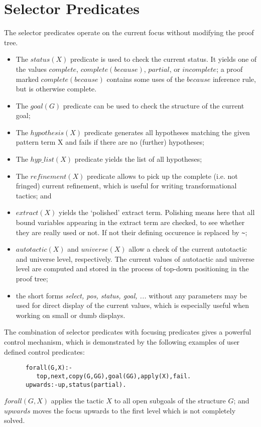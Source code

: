 \documentclass[11pt]{report}
\begin{document}
 \section{Selector Predicates}
 The selector predicates operate on the current focus without
 modifying the proof tree.
 \begin{itemize}
 \item
 The $status(X)$ predicate is used to check the current status.
 It yields one of the values $complete$, $complete(because)$, $partial$, or
 $incomplete$; a proof marked $complete(because)$ contains some uses
 of the $because$ inference rule, but is otherwise complete.
 \item
 The $goal(G)$ predicate can be used to check the structure
 of the current goal; 
 \item
 The $hypothesis(X)$ predicate generates all hypotheses matching the
 given pattern term X and fails if there are no (further) hypotheses;
 \item
 The $hyp\_list(X)$ predicate yields the list of all hypotheses;
 \item
 The $refinement(X)$ predicate allows to pick up the complete 
 (i.e. not fringed) current refinement,
 which is useful for writing transformational tactics; and
 \item
 $extract(X)$ yields the `polished' extract term. Polishing means
 here that all bound variables appearing in the extract term
 are checked, to see whether they are really used or not. If not their
 defining occurence is replaced by \verb'~';
 \item
 $autotactic(X)$ and $universe(X)$ allow a check of the
 current autotactic and universe level, respectively.
 The current values of autotactic and universe level are
 computed and stored in the process of top-down positioning in the
 proof tree;
 \item
 the short forms \emph{select, pos, status, goal, ...} without any
 parameters may be used for direct display of the current values,
 which is especially useful when working on small or dumb displays.
 \end{itemize}
 The combination of selector predicates with focusing predicates
 gives a powerful control mechanism, which is demonstrated by the
 following examples of user defined control predicates: 
 \begin{verbatim}
      forall(G,X):-
         top,next,copy(G,GG),goal(GG),apply(X),fail.
      upwards:-up,status(partial).
 \end{verbatim}
 $forall(G,X)$ applies the tactic $X$ to all open 
 subgoals of the structure $G$;
 and $upwards$ moves the focus upwards to the 
 first level which is not completely solved.
  
\end{document}
